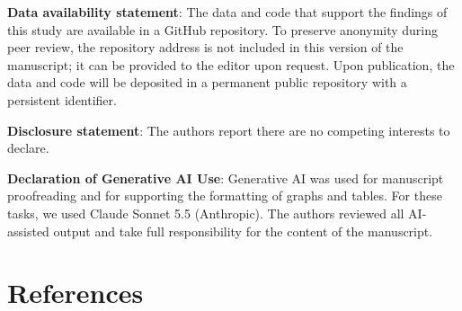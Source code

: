 \documentclass[
  11pt,
]{article}
\begin{document}
\textbf{Data availability statement}: The data and code that support the
findings of this study are available in a GitHub repository. To preserve
anonymity during peer review, the repository address is not included in
this version of the manuscript; it can be provided to the editor upon
request. Upon publication, the data and code will be deposited in a
permanent public repository with a persistent identifier.

\textbf{Disclosure statement}: The authors report there are no competing
interests to declare.

\textbf{Declaration of Generative AI Use}: Generative AI was used for
manuscript proofreading and for supporting the formatting of graphs and
tables. For these tasks, we used Claude Sonnet 5.5 (Anthropic). The
authors reviewed all AI-assisted output and take full responsibility for
the content of the manuscript.

\section{References}\label{references}
\end{document}
